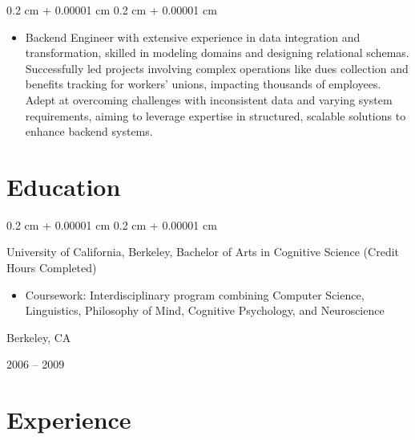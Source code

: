 \documentclass[10pt, letterpaper]{article}
\newenvironment{highlights}{
    \begin{itemize}[
        topsep=0.10 cm,
        parsep=0.10 cm,
        partopsep=0pt,
        itemsep=0pt,
        leftmargin=0.4 cm + 10pt
    ]
}{
    \end{itemize}
} %
\newenvironment{highlightsforbulletentries}{
    \begin{itemize}[
        topsep=0.10 cm,
        parsep=0.10 cm,
        partopsep=0pt,
        itemsep=0pt,
        leftmargin=10pt
    ]
}{
    \end{itemize}
} %
\newenvironment{onecolentry}{
    \begin{adjustwidth}{
        0.2 cm + 0.00001 cm
    }{
        0.2 cm + 0.00001 cm
    }
}{
    \end{adjustwidth}
} %
\newenvironment{twocolentry}[2][]{
    \onecolentry
    \def\secondColumn{#2}
    \setcolumnwidth{\fill, 4.5 cm}
    \begin{paracol}{2}
}{
    \switchcolumn \raggedleft \secondColumn
    \end{paracol}
    \endonecolentry
} %
\begin{document}
    \begin{onecolentry}
        \begin{highlightsforbulletentries}

        
            \item Backend Engineer with extensive experience in data integration and transformation, skilled in modeling domains and designing relational schemas. Successfully led projects involving complex operations like dues collection and benefits tracking for workers' unions, impacting thousands of employees. Adept at overcoming challenges with inconsistent data and varying system requirements, aiming to leverage expertise in structured, scalable solutions to enhance backend systems. 
        

        \end{highlightsforbulletentries}
    \end{onecolentry}

    \section{Education}



        
        
            \begin{twocolentry}{
                Berkeley, CA

                2006 – 2009
            }
                University of California, Berkeley, Bachelor of Arts in Cognitive Science (Credit Hours Completed)
                \begin{highlights}
                    \item Coursework: Interdisciplinary program combining Computer Science, Linguistics, Philosophy of Mind, Cognitive Psychology, and Neuroscience
                \end{highlights}
            \end{twocolentry}
        


    
    \section{Experience}
\end{document}
